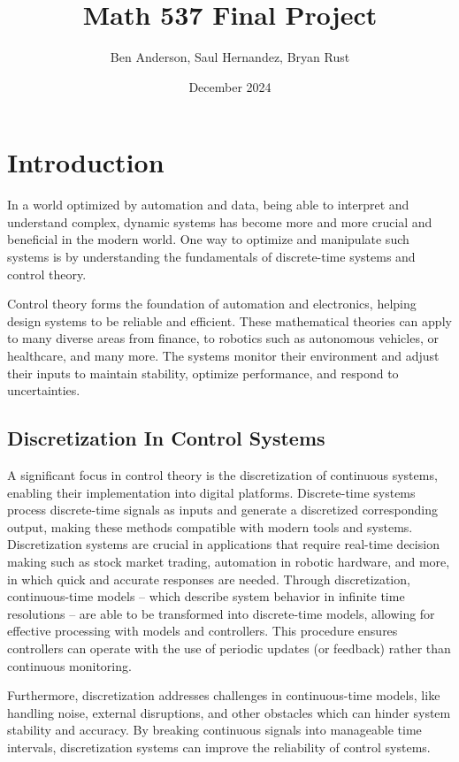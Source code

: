 \documentclass{article}
\title{Math 537 Final Project}
\author{Ben Anderson, Saul Hernandez, Bryan Rust}
\date{December 2024}
\begin{document}
\maketitle

\section{Introduction}
In a world optimized by automation and data, being able to interpret and understand complex, dynamic systems has become more and more crucial and beneficial in the modern world. One way to optimize and manipulate such systems is by understanding the fundamentals of discrete-time systems and control theory. 

Control theory forms the foundation of automation and electronics, helping design systems to be reliable and efficient. These mathematical theories can apply to many diverse areas from finance, to robotics such as autonomous vehicles, or healthcare, and many more. The systems monitor their environment and adjust their inputs to maintain stability, optimize performance, and respond to uncertainties.

\subsection{Discretization In Control Systems}
A significant focus in control theory is the discretization of continuous systems, enabling their implementation into digital platforms. Discrete-time systems process discrete-time signals as inputs and generate a discretized corresponding output, making these methods compatible with modern tools and systems. Discretization systems are crucial in applications that require real-time decision making such as stock market trading, automation in robotic hardware, and more, in which quick and accurate responses are needed. Through discretization, continuous-time models – which describe system behavior in infinite time resolutions – are able to be transformed  into discrete-time models, allowing for effective processing with models and controllers. This procedure ensures controllers can operate with the use of periodic updates (or feedback) rather than continuous monitoring. 

Furthermore, discretization addresses challenges in continuous-time models, like handling noise, external disruptions, and other obstacles which can hinder system stability and accuracy. By breaking continuous signals into manageable time intervals, discretization systems can improve the reliability of control systems. \cite{keles2024}
\end{document}
